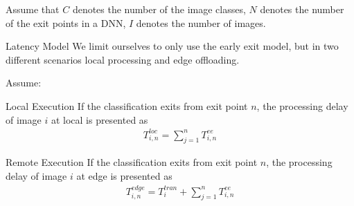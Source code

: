 	
	Assume that $ C $ denotes the number of the image classes, $ N $ denotes the number of the exit points in a DNN, $ I $ denotes the number of images.
	\begin{enumdescript}
		\item[Latency Model] We limit ourselves to only use the early exit model, but in two different scenarios local processing and edge offloading.  %
		
		Assume:
		\begin{enumdescript}
			\item[Local Execution] If the classification exits from exit point $ n $, the processing delay of image $ i $ at local is presented as
			\begin{align}
			T_{i,n}^{loc}=\sum_{j=1}^{n} T^{ee}_{i,n} 
			\end{align}
			\item[Remote Execution] If the classification exits from exit point $ n $, the processing delay of image $ i $ at edge is presented as
			\begin{align}
			T_{i,n}^{edge}=T_{i}^{tran}+\sum_{j=1}^{n} T^{ee}_{i,n}
			\end{align}
		\end{enumdescript}
	

\end{enumdescript}
